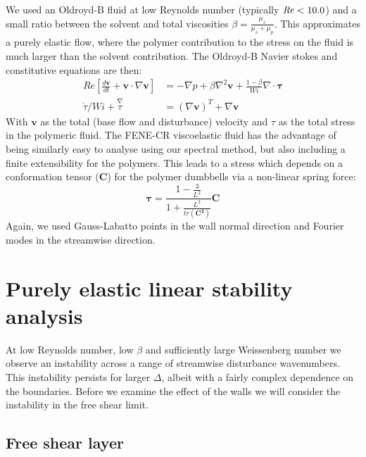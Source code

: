 \documentclass{jfm}
\newcommand{\dt}[1]{\frac{d #1}{d t}} %
\newcommand\Rey{\mbox{\textit{Re}}}  %
\begin{document}
We used an Oldroyd-B fluid at low Reynolds number (typically $\Rey < 10.0$)
and a small ratio between the solvent and total viscosities $\beta =
\frac{\mu_{s}}{\mu_{s}+\mu_{p}}$. This approximates a purely elastic flow,
where the polymer contribution to the stress on the fluid is much larger  than
the solvent contribution. The Oldroyd-B Navier stokes and constitutive
equations are then: 
\begin{align} 
    Re \left[ \dt{\mathbf{v}} +
    \mathbf{v} \cdot \nabla  \mathbf{v} \right] &= - \nabla p + \beta
    \nabla^{2} \mathbf{v} + \frac{1-\beta}{Wi} \nabla \cdot \mathbf{\tau} \\
    \dot{\tau}/Wi + \overset{\nabla}\tau &= \left(\nabla \mathbf{v}\right)^{T}
    + \nabla{\mathbf{v}} 
\end{align} 
With $\mathbf{v}$ as the total (base flow and disturbance) velocity and $\tau$
as the total stress in the polymeric fluid. The FENE-CR viscoelastic fluid has
the advantage of being similarly easy to analyse using our spectral method, but
also including a finite extensibility for the polymers. This leads to a stress
which depends on a conformation tensor ($\mathbf{C}$) for the polymer dumbbells
via a non-linear spring force:
\begin{equation} 
    \mathbf{\tau} = \frac{1-\frac{3}{L^{2}}}{1 +
	\frac{L^{2}}{tr(\mathbf{C^{2}})}} \mathbf{C} \label{eq:KH_FENE_stress}
\end {equation}
Again, we used Gauss-Labatto points in the wall normal direction and Fourier
modes in the streamwise direction.

\FloatBarrier

\section{Purely elastic linear stability analysis}\label{sec:KH_linear_stability_analysis}

At low Reynolds number, low $\beta$ and sufficiently large Weissenberg number
we observe an instability across a range of streamwise disturbance wavenumbers.
This instability persists for larger $\Delta$, albeit with a fairly complex
dependence on the boundaries. Before we examine the effect of the walls we will
consider the instability in the free shear limit.

\subsection{Free shear layer}
\end{document}
